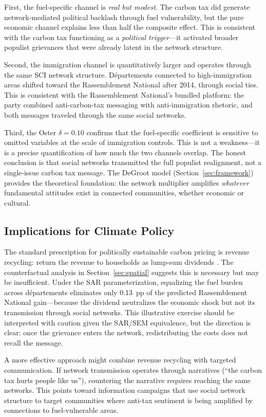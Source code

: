 \documentclass[12pt]{article}
\newcommand{\rn}{Rassemblement National}
\newcommand{\depts}{d\'{e}partements}
\begin{document}
First, the fuel-specific channel is \emph{real but modest}. The carbon tax did generate network-mediated political backlash through fuel vulnerability, but the pure economic channel explains less than half the composite effect. This is consistent with the carbon tax functioning as a \emph{political trigger}---it activated broader populist grievances that were already latent in the network structure.

Second, the immigration channel is quantitatively larger and operates through the same SCI network structure. D\'{e}partements connected to high-immigration areas shifted toward the \rn{} after 2014, through social ties. This is consistent with the \rn{}'s bundled platform: the party combined anti-carbon-tax messaging with anti-immigration rhetoric, and both messages traveled through the same social networks.

Third, the Oster $\delta = 0.10$ confirms that the fuel-specific coefficient is sensitive to omitted variables at the scale of immigration controls. This is not a weakness---it is a precise quantification of how much the two channels overlap. The honest conclusion is that social networks transmitted the full populist realignment, not a single-issue carbon tax message. The DeGroot model (Section~\ref{sec:framework}) provides the theoretical foundation: the network multiplier amplifies \emph{whatever} fundamental attitudes exist in connected communities, whether economic or cultural.

\subsection{Implications for Climate Policy}

The standard prescription for politically sustainable carbon pricing is revenue recycling: return the revenue to households as lump-sum dividends \citep{klenert2018carbon, stiglitz2019addressing}. The counterfactual analysis in Section~\ref{sec:spatial} suggests this is necessary but may be insufficient. Under the SAR parameterization, equalizing the fuel burden across \depts{} eliminates only 0.13~pp of the predicted \rn{} gain---because the dividend neutralizes the economic shock but not its transmission through social networks. This illustrative exercise should be interpreted with caution given the SAR/SEM equivalence, but the direction is clear: once the grievance enters the network, redistributing the costs does not recall the message.

A more effective approach might combine revenue recycling with targeted communication. If network transmission operates through narratives (``the carbon tax hurts people like us''), countering the narrative requires reaching the same networks. This points toward information campaigns that use social network structure to target communities where anti-tax sentiment is being amplified by connections to fuel-vulnerable areas.
\end{document}
